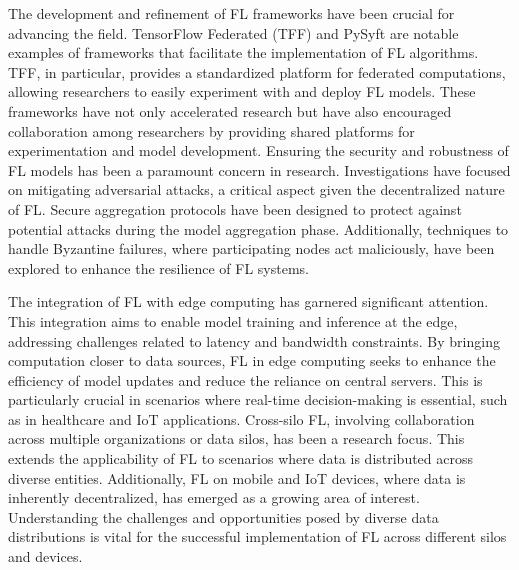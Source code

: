 \documentclass[conference]{IEEEtran}
\begin{document}
The development and refinement of FL frameworks have been crucial for advancing the field. TensorFlow Federated (TFF) and PySyft are notable examples of frameworks that facilitate the implementation of FL algorithms. TFF, in particular, provides a standardized platform for federated computations, allowing researchers to easily experiment with and deploy FL models. These frameworks have not only accelerated research but have also encouraged collaboration among researchers by providing shared platforms for experimentation and model development. Ensuring the security\cite{8} and robustness of FL models has been a paramount concern in research. Investigations have focused on mitigating adversarial attacks, a critical aspect given the decentralized nature of FL. Secure aggregation protocols have been designed to protect against potential attacks during the model aggregation phase. Additionally, techniques to handle Byzantine failures, where participating nodes act maliciously, have been explored to enhance the resilience of FL systems.


The integration of FL with edge computing\cite{9} has garnered significant attention. This integration aims to enable model training and inference at the edge, addressing challenges related to latency and bandwidth constraints. By bringing computation closer to data sources, FL in edge computing seeks to enhance the efficiency of model updates and reduce the reliance on central servers. This is particularly crucial in scenarios where real-time decision-making is essential, such as in healthcare and IoT applications. Cross-silo FL, involving collaboration across multiple organizations or data silos, has been a research focus. This extends the applicability of FL to scenarios where data is distributed across diverse entities\cite{7}. Additionally, FL on mobile and IoT devices, where data is inherently decentralized, has emerged as a growing area of interest. Understanding the challenges and opportunities posed by diverse data distributions is vital for the successful implementation of FL across different silos and devices.
\end{document}
